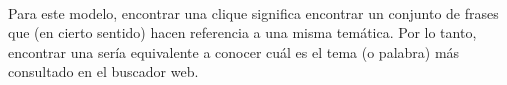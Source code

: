 \paragraph{}
Para este modelo, encontrar una clique significa encontrar un conjunto de frases que (en cierto sentido) hacen referencia a una misma temática. Por lo tanto, encontrar una \mc sería equivalente a conocer cuál es el tema (o palabra) más consultado en el buscador web.
